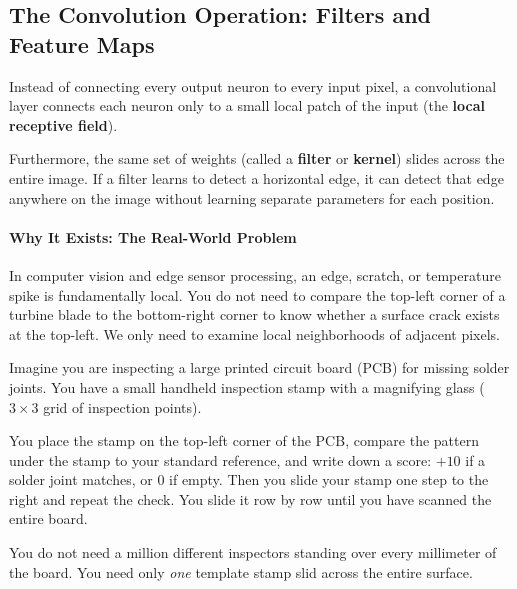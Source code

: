 \subsection{The Convolution Operation: Filters and Feature Maps}\label{subsec:convolution_op}

\begin{keyidea}
Instead of connecting every output neuron to every input pixel, a convolutional layer connects each neuron only to a small local patch of the input (the \textbf{local receptive field}). 

Furthermore, the same set of weights (called a \textbf{filter} or \textbf{kernel}) slides across the entire image. If a filter learns to detect a horizontal edge, it can detect that edge anywhere on the image without learning separate parameters for each position.
\end{keyidea}

\paragraph{Why It Exists: The Real-World Problem}
In computer vision and edge sensor processing, an edge, scratch, or temperature spike is fundamentally local. You do not need to compare the top-left corner of a turbine blade to the bottom-right corner to know whether a surface crack exists at the top-left. We only need to examine local neighborhoods of adjacent pixels.

\begin{analogy}
Imagine you are inspecting a large printed circuit board (PCB) for missing solder joints. You have a small handheld inspection stamp with a magnifying glass ($3 \times 3$ grid of inspection points). 

You place the stamp on the top-left corner of the PCB, compare the pattern under the stamp to your standard reference, and write down a score: $+10$ if a solder joint matches, or $0$ if empty. Then you slide your stamp one step to the right and repeat the check. You slide it row by row until you have scanned the entire board. 

You do not need a million different inspectors standing over every millimeter of the board. You need only \emph{one} template stamp slid across the entire surface.
\end{analogy}

